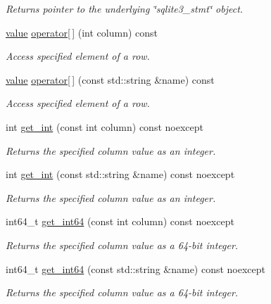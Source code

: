 \begin{DoxyCompactItemize}
\begin{DoxyCompactList}\small\item\em Returns pointer to the underlying \char`\"{}sqlite3\-\_\-stmt\char`\"{} object. \end{DoxyCompactList}\item 
\hyperlink{a00015}{value} \hyperlink{a00011_a0c8e886d5beb078d5111bdf812232c60}{operator\mbox{[}$\,$\mbox{]}} (int column) const 
\begin{DoxyCompactList}\small\item\em Access specified element of a row. \end{DoxyCompactList}\item 
\hyperlink{a00015}{value} \hyperlink{a00011_adcc08612b2968a75124edc91c0d6c72f}{operator\mbox{[}$\,$\mbox{]}} (const std\-::string \&name) const 
\begin{DoxyCompactList}\small\item\em Access specified element of a row. \end{DoxyCompactList}\item 
int \hyperlink{a00010_a1c720c80fd5c1f0f618c24a3d09e2ef5}{get\-\_\-int} (const int column) const noexcept
\begin{DoxyCompactList}\small\item\em Returns the specified column value as an integer. \end{DoxyCompactList}\item 
int \hyperlink{a00010_a7e1f86fdffd271cb92deb0b21d22fd05}{get\-\_\-int} (const std\-::string \&name) const noexcept
\begin{DoxyCompactList}\small\item\em Returns the specified column value as an integer. \end{DoxyCompactList}\item 
int64\-\_\-t \hyperlink{a00010_afaf16f586744a6bc0ecfb74ab791306c}{get\-\_\-int64} (const int column) const noexcept
\begin{DoxyCompactList}\small\item\em Returns the specified column value as a 64-\/bit integer. \end{DoxyCompactList}\item 
int64\-\_\-t \hyperlink{a00010_a87383f607d2ffc2875eac57ecf8e3989}{get\-\_\-int64} (const std\-::string \&name) const noexcept
\begin{DoxyCompactList}\small\item\em Returns the specified column value as a 64-\/bit integer. \end{DoxyCompactList}\item 

\end{DoxyCompactItemize}
